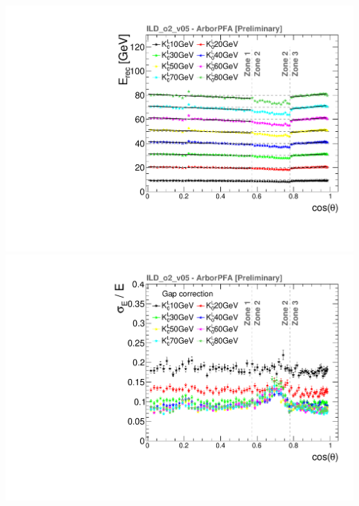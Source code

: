 \documentclass[8pt]{beamer}
\begin{document}
\begin{frame}
\begin{minipage}{0.5\linewidth}
\begin{center}
\begin{overprint}
           \centering \includegraphics[width=0.8\linewidth]{ERecLinGap_fits_thesis.pdf} \\ \includegraphics[width=0.8\linewidth]{EResLinGap_thesis.pdf}

\end{overprint}
\end{center}
\end{minipage}
\end{frame}
\end{document}
